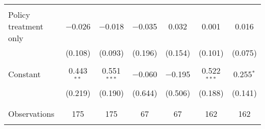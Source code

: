 \begin{tabular}{@{\extracolsep{5pt}}lcccccc}
  & & & & & & \\ 
 Policy treatment only & $-$0.026 & $-$0.018 & $-$0.035 & 0.032 & 0.001 & 0.016 \\ 
  & (0.108) & (0.093) & (0.196) & (0.154) & (0.101) & (0.075) \\ 
  & & & & & & \\ 
 Constant & 0.443$^{**}$ & 0.551$^{***}$ & $-$0.060 & $-$0.195 & 0.522$^{***}$ & 0.255$^{*}$ \\ 
  & (0.219) & (0.190) & (0.644) & (0.506) & (0.188) & (0.141) \\ 
  & & & & & & \\ 
\hline \\[-1.8ex] 

Observations & 175 & 175 & 67 & 67 & 162 & 162 \\ 
\hline 
\hline \\[-1.8ex] 
\end{tabular} 